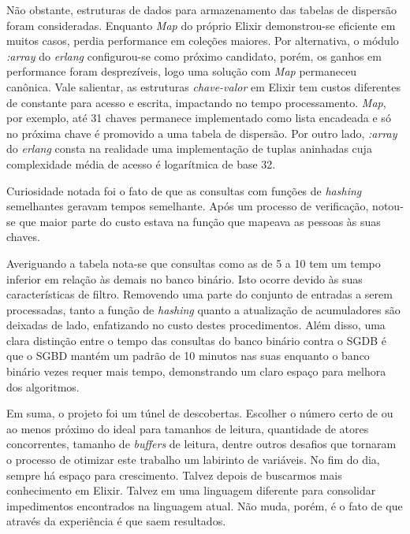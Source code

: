 \documentclass[12pt]{article}
\begin{document}
Não obstante, estruturas de dados para armazenamento das tabelas de dispersão foram 
consideradas. Enquanto \textit{Map} do próprio Elixir demonstrou-se eficiente em muitos casos,
perdia performance em coleções maiores. Por alternativa, o módulo \textit{:array} do 
\textit{erlang} configurou-se como próximo candidato, porém, os ganhos em performance foram
desprezíveis, logo uma solução com \textit{Map} permaneceu canônica. Vale salientar, as
estruturas \textit{chave-valor} em Elixir tem custos diferentes de constante para
acesso e escrita, impactando no tempo processamento. \textit{Map}, por exemplo, até 31 chaves
permanece implementado como lista encadeada e só no próxima chave é promovido a uma tabela de dispersão.
Por outro lado, \textit{:array} do \textit{erlang} consta na realidade uma implementação de tuplas aninhadas
cuja complexidade média de acesso é logarítmica de base 32.

Curiosidade notada foi o fato de que as consultas com funções de \textit{hashing} semelhantes
geravam tempos semelhante. Após um processo de verificação, notou-se que maior parte do
custo estava na função que mapeava as pessoas às suas chaves.

Averiguando a tabela nota-se que consultas como as de 5 a 10 tem um tempo inferior em
relação às demais no banco binário. Isto ocorre devido às suas características de filtro. 
Removendo uma parte do conjunto de entradas a serem processadas, tanto a função de \textit{hashing}
quanto a atualização de acumuladores são deixadas de lado, enfatizando no custo destes
procedimentos. Além disso, uma clara distinção entre o tempo das consultas do banco binário 
contra o SGDB é que o SGBD mantém um padrão de 10 minutos nas suas enquanto o banco
binário vezes requer mais tempo, demonstrando um claro espaço para melhora dos algoritmos.

Em suma, o projeto foi um túnel de descobertas. Escolher o número certo de ou ao menos
próximo do ideal para tamanhos de leitura, quantidade de atores concorrentes, tamanho de
\textit{buffers} de leitura, dentre outros desafios que tornaram o processo de otimizar
este trabalho um labirinto de variáveis. No fim do dia, sempre há espaço para crescimento.
Talvez depois de buscarmos mais conhecimento em Elixir. Talvez em uma linguagem diferente
para consolidar impedimentos encontrados na linguagem atual. Não muda, porém, é o fato
de que através da experiência é que saem resultados.

% 
% 
\end{document}
